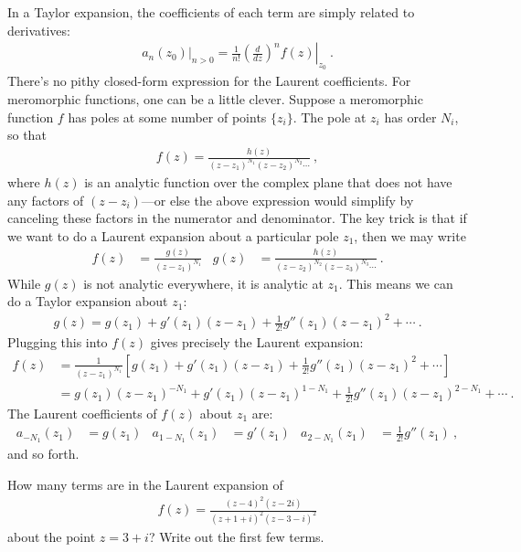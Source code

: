 In a Taylor expansion, the coefficients of each term are simply related to derivatives:
\begin{align}
  \left.a_n(z_0)\right|_{n>0}
  = 
  \frac{1}{n!}\left.\left(\frac{d}{dz}\right)^n f(z)\right|_{z_0} \ .
\end{align}
There's no pithy closed-form expression for the Laurent coefficients. For meromorphic functions, one can be a little clever. Suppose a meromorphic function $f$ has poles at some number of points $\{z_i\}$. The pole at $z_i$ has order $N_i$, so that
\begin{align}
  f(z) = \frac{h(z)}{(z-z_1)^{N_1}(z-z_2)^{N_2}\cdots} \ ,
\end{align}
where $h(z)$ is an analytic function over the complex plane that does not have any factors of $(z-z_i)$---or else the above expression would simplify by canceling these factors in the numerator and denominator. The key trick is that if we want to do a Laurent expansion about a particular pole $z_1$, then we may write
\begin{align}
  f(z) &= \frac{g(z)}{(z-z_1)^{N_1}}
  &
  g(z) &= \frac{h(z)}{(z-z_2)^{N_2}(z-z_3)^{N_3}\cdots} \ .
\end{align}
While $g(z)$ is not analytic everywhere, it {is analytic} at $z_1$. This means we can do a Taylor expansion about $z_1$:
\begin{align}
  g(z) = g(z_1) + g'(z_1)(z-z_1) + \frac{1}{2!}g''(z_1)(z-z_1)^2 + \cdots \ .
\end{align}
Plugging this into $f(z)$ gives precisely the Laurent expansion:
\begin{align}
  f(z) &= \frac{1}{(z-z_1)^{N_1}}
  \left[
  g(z_1) + g'(z_1)(z-z_1) + \frac{1}{2!}g''(z_1)(z-z_1)^2 + \cdots
  \right]
  \\
  &=
  g(z_1)(z-z_1)^{-N_1} 
  + g'(z_1)(z-z_1)^{1-N_1} 
  + \frac{1}{2!}g''(z_1)(z-z_1)^{2-N_1} + \cdots \ .
\end{align}
The Laurent coefficients of $f(z)$ about $z_1$ are:
\begin{align}
  a_{-N_1}(z_1) &= g(z_1)
  &
  a_{1-N_1}(z_1) &= g'(z_1)
  &
  a_{2-N_1}(z_1) &= \frac{1}{2!}g''(z_1) \ ,
\end{align}
and so forth.

\begin{exercise}
How many terms are in the Laurent expansion of
\begin{align}
  f(z) = \frac{(z-4)^2(z-2i)}{(z+1+i)^2(z-3-i)^2} 
\end{align}
about the point $z = 3+i$? Write out the first few terms.
\end{exercise}


